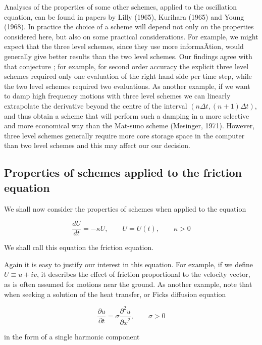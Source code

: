 Analyses of the properties of some other schemes, applied to the
oscillation equation, can be found in papers by Lilly (1965), Kurihara
(1965) and Young (1968). In practice the choice of a scheme will depend
not only on the properties considered here, but also on some practical
considerations. For example, we might expect that the three level
schemes, since they use more informaÂ­tion, would generally give better
results than the two level schemes. Our findings agree with that
conjecture ; for example, for second order accuracy the explicit three
level schemes required only one evaluation of the right hand side per
time step, while the two level schemes required two evaluations. As
another example, if we want to damp high frequency motions with three
level schemes we can linearly extrapolate the derivative beyond the
centre of the interval
\(\left( n\Delta t,\left( n + 1 \right)\Delta t \right)\), and thus
obtain a scheme that will perform such a damping in a more selective and
more economical way than the Mat-suno scheme (Mesinger, 1971). However,
three level schemes generally require more core storage space in the
computer than two level schemes and this may affect our our decision.

\subsection{\texorpdfstring{\textbf{Properties of schemes applied to the
friction
equation}}{Properties of schemes applied to the friction equation}}\label{properties-of-schemes-applied-to-the-friction-equation}

We shall now consider the properties of schemes when applied to the
equation

\[\frac{d U}{d t} = - \kappa U, \qquad U = U\left( t \right), \qquad \kappa > 0\]

We shall call this equation the friction equation.

Again it is easy to justify our interest in this equation. For example,
if we define \(U \equiv u + iv\), it describes the effect of friction
proportional to the velocity vector, as is often assumed for motions
near the ground. As another example, note that when seeking a solution
of the heat transfer, or Fick\textquotesingle s diffusion equation

\[\frac{\partial u}{\partial t} = \sigma\frac{\partial^{2} u }{{\partial x}^{2}}, \qquad \sigma > 0\]

in the form of a single harmonic component

